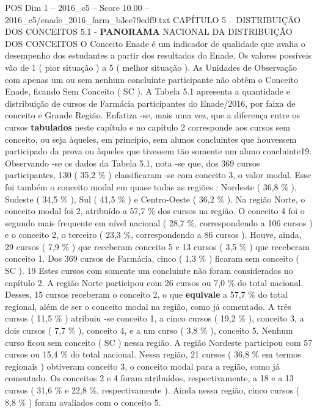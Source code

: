 \begin{textsample}{POS Dim 1 – 2016\_c5 – Score 10.00 – 2016\_c5/enade\_2016\_farm\_b3ee79edf9.txt}  \label{ex:f1_pos_079}
CAPÍTULO 5 – DISTRIBUIÇÃO DOS CONCEITOS 5.1 - \textbf{PANORAMA} NACIONAL DA DISTRIBUIÇÃO DOS CONCEITOS O Conceito Enade é um indicador de qualidade que avalia o desempenho dos estudantes a partir dos resultados do Enade.
Os valores possíveis vão de 1 ( pior situação ) a 5 ( melhor situação ).
As Unidades de Observação com apenas um ou sem nenhum concluinte participante não obtêm o Conceito Enade, ficando Sem Conceito ( SC ).
A Tabela 5.1 apresenta a quantidade e distribuição de cursos de Farmácia participantes do Enade/2016, por faixa de conceito e Grande Região.
Enfatiza -se, mais uma vez, que a diferença entre os cursos \textbf{tabulados} neste capítulo e no capítulo 2 corresponde aos cursos sem conceito, ou seja àqueles, em princípio, sem alunos concluintes que houvessem participado da prova ou àqueles que tivessem tão somente um aluno concluinte19.
Observando -se os dados da Tabela 5.1, nota -se que, dos 369 cursos participantes, 130 ( 35,2 \% ) classificaram -se com conceito 3, o valor modal.
Esse foi também o conceito modal em quase todas as regiões : Nordeste ( 36,8 \% ), Sudeste ( 34,5 \% ), Sul ( 41,5 \% ) e Centro-Oeste ( 36,2 \% ).
Na região Norte, o conceito modal foi 2, atribuído a 57,7 \% dos cursos na região.
O conceito 4 foi o segundo mais frequente em nível nacional ( 28,7 \%, correspondendo a 106 cursos ) e o conceito 2, o terceiro ( 23,3 \%, correspondendo a 86 cursos ).
Houve, ainda, 29 cursos ( 7,9 \% ) que receberam conceito 5 e 13 cursos ( 3,5 \% ) que receberam conceito 1.
Dos 369 cursos de Farmácia, cinco ( 1,3 \% ) ficaram sem conceito ( SC ). 19 Estes cursos com somente um concluinte não foram considerados no capítulo 2.
A região Norte participou com 26 cursos ou 7,0 \% do total nacional.
Desses, 15 cursos receberam o conceito 2, o que \textbf{equivale} a 57,7 \% do total regional, além de ser o conceito modal na região, como já comentado.
A três cursos ( 11,5 \% ) atribuiu -se conceito 1, a cinco cursos ( 19,2 \% ), conceito 3, a dois cursos ( 7,7 \% ), conceito 4, e a um curso ( 3,8 \% ), conceito 5.
Nenhum curso ficou sem conceito ( SC ) nessa região.
A região Nordeste participou com 57 cursos ou 15,4 \% do total nacional.
Nessa região, 21 cursos ( 36,8 \% em termos regionais ) obtiveram conceito 3, o conceito modal para a região, como já comentado.
Os conceitos 2 e 4 foram atribuídos, respectivamente, a 18 e a 13 cursos ( 31,6 \% e 22,8 \%, respectivamente ).
Ainda nessa região, cinco cursos ( 8,8 \% ) foram avaliados com o conceito 5.

\end{textsample}
